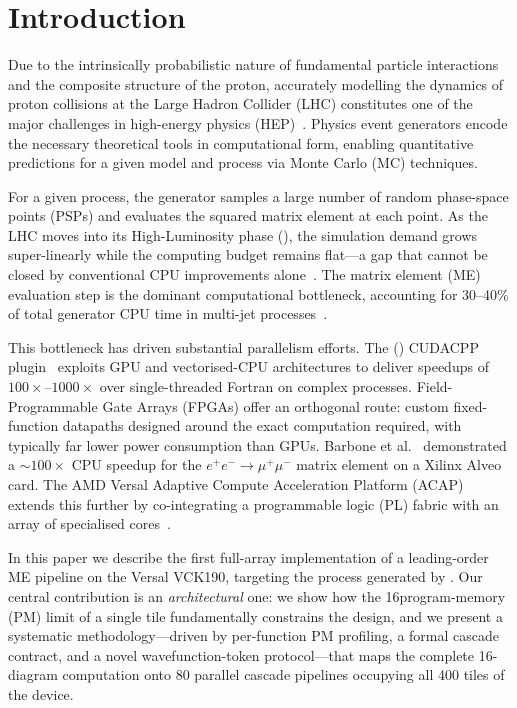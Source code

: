 
\section{Introduction}\label{sec:intro}

Due to the intrinsically probabilistic nature of fundamental particle
interactions and the composite structure of the proton, accurately modelling
the dynamics of proton collisions at the Large Hadron Collider (LHC)
constitutes one of the major challenges in high-energy physics
(HEP)~\cite{HSFPhysicsEventGeneratorWG:2020gxw}.  Physics event generators
encode the necessary theoretical tools in computational form, enabling
quantitative predictions for a given model and process via Monte Carlo (MC)
techniques.

For a given process, the generator samples a large number of random
phase-space points (PSPs) and evaluates the squared matrix element \ME at each
point.  As the LHC moves into its High-Luminosity phase (\hilumi), the
simulation demand grows super-linearly while the computing budget remains
flat---a gap that cannot be closed by conventional CPU improvements
alone~\cite{HSFPhysicsEventGeneratorWG:2020gxw}.  The matrix element (ME)
evaluation step is the dominant computational bottleneck, accounting for
30--40\% of total generator CPU time in multi-jet processes~\cite{Valassi:2021ljk}.

This bottleneck has driven substantial parallelism efforts.  The \amcnlo
(\mgfive) CUDACPP plugin~\cite{Valassi:2025xfn} exploits GPU and
vectorised-CPU architectures to deliver speedups of
$100\times$--$1000\times$ over single-threaded Fortran on complex processes.
Field-Programmable Gate Arrays (FPGAs) offer an orthogonal route: custom
fixed-function datapaths designed around the exact computation required, with
typically far lower power consumption than GPUs.  Barbone et
al.~\cite{Carrazza:2021gpx} demonstrated a ${\sim}100\times$ CPU speedup for
the $e^+e^-\to\mu^+\mu^-$ matrix element on a Xilinx Alveo card.  The AMD
Versal Adaptive Compute Acceleration Platform (ACAP) extends this further by
co-integrating a programmable logic (PL) fabric with an array of specialised
\aie cores~\cite{Barbone:2023mul}.

In this paper we describe the first full-array implementation of a
leading-order ME pipeline on the Versal VCK190, targeting the
\ggttg process generated by \mgfive.  Our central contribution is an
\textit{architectural} one: we show how the 16\KB program-memory (PM) limit of
a single \aie tile fundamentally constrains the design, and we present a
systematic methodology---driven by per-function PM profiling, a formal cascade
contract, and a novel wavefunction-token protocol---that maps the complete
16-diagram \ggttg computation onto 80 parallel cascade pipelines occupying all
400 \aie tiles of the device.

